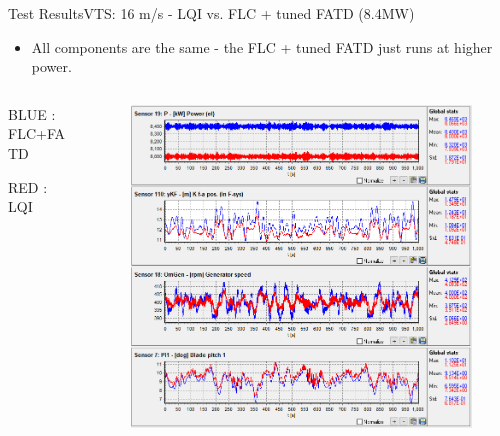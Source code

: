 \begin{frame}{Test Results}{VTS: 16 m/s - LQI vs. FLC + tuned FATD (8.4MW)}
	\begin{itemize}
		\item \small{All components are the same - the FLC + tuned FATD just runs at higher power.}
	\end{itemize}
	\begin{columns}
		\begin{column}{.25\linewidth}
				\small{BLUE}
				\small{: FLC+FATD}
				
				\smallskip
				\small{RED}
				\small{: LQI}
		\end{column}
		\begin{column}{.75\linewidth}
			\begin{figure}[h]
				\centering
				\includegraphics[width=0.98\linewidth]{Graphics/brmrcCompare.PNG}
				\label{fig:brmrc_comparison}
			\end{figure}
		\end{column}
	\end{columns}	
\end{frame}


